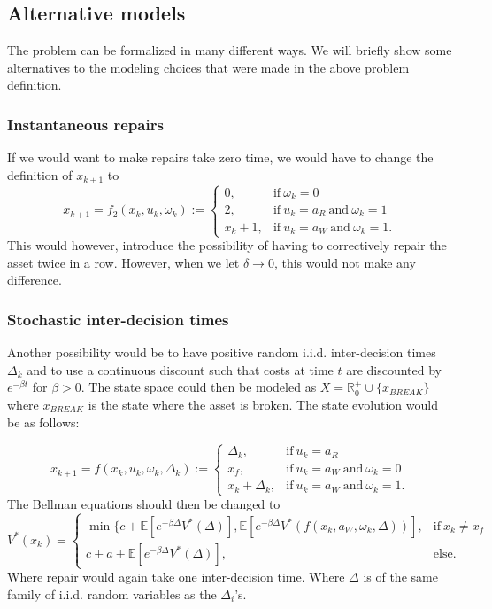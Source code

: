 \documentclass[a4paper]{thesis}
\theoremstyle{definition}
\begin{document}
\subsection{Alternative models}
The problem can be formalized in many different ways.
We will briefly show some alternatives to the modeling choices that were made in the above problem definition.
\subsubsection{Instantaneous repairs}
If we would want to make repairs take zero time, we would have to change the definition of $x_{k+1}$ to 
$$
x_{k+1}=f_2(x_k,u_k,\omega_k):=\begin{cases}
0,&\text{if}\ \omega_k=0 \\
2,&\text{if}\ u_k=a_R\ \text{and}\ \omega_k=1\\
x_k+1,&\text{if}\ u_k=a_W\ \text{and}\ \omega_k=1.
\end{cases}
$$
This would however, introduce the possibility of having to correctively repair the asset twice in a row.
However, when we let $\delta\rightarrow 0$, this would not make any difference.

\subsubsection{Stochastic inter-decision times}
Another possibility would be to have positive random i.i.d. inter-decision times $\Delta_k$ and to use a continuous discount such that costs at time $t$ are discounted by $e^{-\beta t}$ for $\beta>0$.
The state space could then be modeled as $X=\mathbb{R}_0^+\cup\{x_{BREAK}\}$ where $x_{BREAK}$ is the state where the asset is broken.
The state evolution would be as follows:

$$
x_{k+1}=f(x_k,u_k,\omega_k,\Delta_k):=\begin{cases}
\Delta_k,&\text{if}\ u_k=a_R \\
x_f,&\text{if}\ u_k=a_W\ \text{and}\ \omega_k=0 \\
x_k+\Delta_k,&\text{if}\ u_k=a_W\ \text{and}\ \omega_k=1.
\end{cases}
$$
The Bellman equations should then be changed to
$$
V^*(x_k)=\begin{cases}
\min\{c+\mathbb{E}[e^{-\beta \Delta} V^*(\Delta)],\mathbb{E}[e^{-\beta \Delta} V^*(f(x_k,a_W,\omega_k,\Delta))],&\text{if}\ x_k\neq x_f \\
c+a+\mathbb{E}[e^{-\beta \Delta} V^*(\Delta)],&\text{else.}
\end{cases}
$$
Where repair would again take one inter-decision time. Where $\Delta$ is of the same family of i.i.d. random variables as the $\Delta_i$'s.
\end{document}
